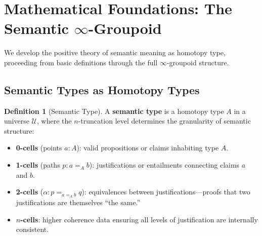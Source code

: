 \documentclass[11pt,a4paper]{article}
\theoremstyle{plain}
\theoremstyle{definition}
\newtheorem{definition}[theorem]{Definition}
\begin{document}
\section{Mathematical Foundations: The Semantic $\infty$-Groupoid}\label{sec:foundations}

We develop the positive theory of semantic meaning as homotopy type, proceeding from basic definitions through the full $\infty$-groupoid structure.

\subsection{Semantic Types as Homotopy Types}

\begin{definition}[Semantic Type]\label{def:semtype}
A \textbf{semantic type} is a homotopy type $A$ in a universe $\mathcal{U}$, where the $n$-truncation level determines the granularity of semantic structure:
\begin{itemize}[nosep]
  \item \textbf{0-cells} (points $a : A$): valid propositions or claims inhabiting type $A$.
  \item \textbf{1-cells} (paths $p : a =_A b$): justifications or entailments connecting claims $a$ and $b$.
  \item \textbf{2-cells} ($\alpha : p =_{a =_A b} q$): equivalences between justifications---proofs that two justifications are themselves ``the same.''
  \item \textbf{$n$-cells}: higher coherence data ensuring all levels of justification are internally consistent.
\end{itemize}
\end{definition}
\end{document}
